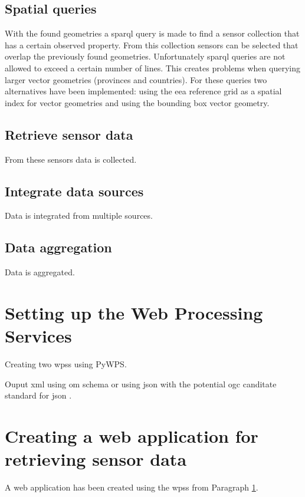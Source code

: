 \subsection{Spatial queries}
With the found geometries a \ac{sparql} query is made to find a sensor collection that has a certain observed property. From this collection sensors can be selected that overlap the previously found geometries. Unfortunately \ac{sparql} queries are not allowed to exceed a certain number of lines. This creates problems when querying larger vector geometries (provinces and countries). For these queries two alternatives have been implemented: using the \ac{eea} reference grid as a spatial index for vector geometries and using the bounding box vector geometry. \\

\subsection{Retrieve sensor data}
From these sensors data is collected. \\

\subsection{Integrate data sources}
Data is integrated from multiple sources.\\

\subsection{Data aggregation}
Data is aggregated.

\section{Setting up the Web Processing Services}
\label{impl:wps}
Creating two \aclp{wps} using PyWPS.

Ouput \ac{xml} using \ac{om} schema or using \ac{json} with the potential \ac{ogc} canditate standard for \ac{json} \citep{SW:OGC6}.

\section{Creating a web application for retrieving sensor data}
A web application has been created using the \aclp{wps} from Paragraph \ref{impl:wps}.
